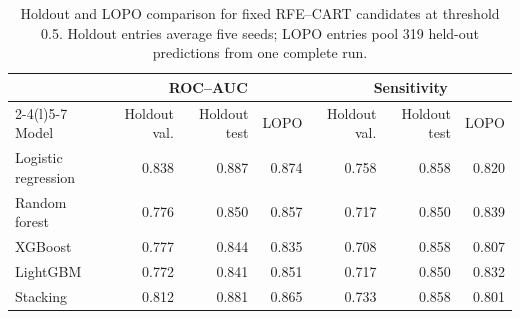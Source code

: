 \begin{table}[H]
\centering\small
\caption{Holdout and LOPO comparison for fixed RFE--CART candidates at threshold 0.5. Holdout entries average five seeds; LOPO entries pool 319 held-out predictions from one complete run.}
\label{tab:holdout-lopo-comparison}
\begin{tabular}{@{}lrrrrrr@{}}
\toprule
& \multicolumn{3}{c}{ROC--AUC} & \multicolumn{3}{c}{Sensitivity} \\
\cmidrule(lr){2-4}\cmidrule(l){5-7}
Model & Holdout val. & Holdout test & LOPO & Holdout val. & Holdout test & LOPO \\
\midrule
Logistic regression & 0.838 & 0.887 & 0.874 & 0.758 & 0.858 & 0.820 \\
Random forest & 0.776 & 0.850 & 0.857 & 0.717 & 0.850 & 0.839 \\
XGBoost & 0.777 & 0.844 & 0.835 & 0.708 & 0.858 & 0.807 \\
LightGBM & 0.772 & 0.841 & 0.851 & 0.717 & 0.850 & 0.832 \\
Stacking & 0.812 & 0.881 & 0.865 & 0.733 & 0.858 & 0.801 \\
\bottomrule
\end{tabular}
\end{table}
